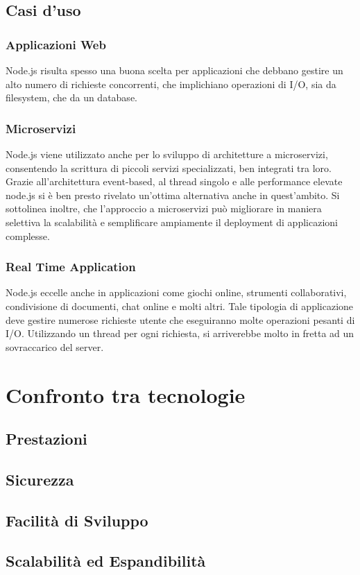 \subsection{Casi d'uso}
\subsubsection{Applicazioni Web}
Node.js risulta spesso una buona scelta per applicazioni che debbano gestire un alto numero di richieste concorrenti, che implichiano operazioni di I/O, sia da filesystem, che da un database.
\subsubsection{Microservizi}
Node.js viene utilizzato anche per lo sviluppo di architetture a microservizi, consentendo la scrittura di piccoli servizi specializzati, ben integrati tra loro. Grazie all'architettura event-based, al thread singolo e alle performance elevate node.js si è ben presto rivelato un'ottima alternativa anche in quest'ambito. Si sottolinea inoltre, che l'approccio a microservizi può migliorare in maniera selettiva la scalabilità e semplificare ampiamente il deployment di applicazioni complesse.
\subsubsection{Real Time Application}
Node.js eccelle anche in applicazioni come giochi online, strumenti collaborativi, condivisione di documenti, chat online e molti altri. Tale tipologia di applicazione deve gestire numerose richieste utente che eseguiranno molte operazioni pesanti di I/O. Utilizzando un thread per ogni richiesta, si arriverebbe molto in fretta ad un sovraccarico del server.
\newpage
\section{Confronto tra tecnologie}
\label{sec:Confronto}
\subsection{Prestazioni}
\subsection{Sicurezza}
\subsection{Facilità di Sviluppo}
\subsection{Scalabilità ed Espandibilità}

